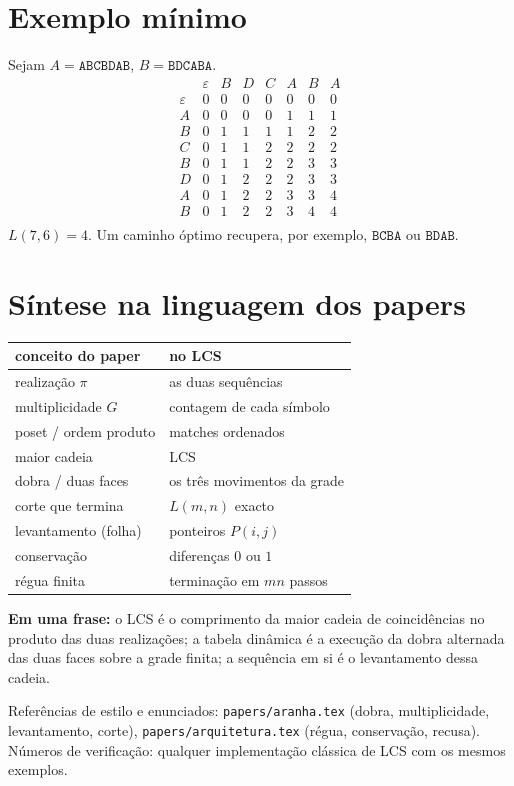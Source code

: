 \documentclass[11pt,a4paper]{article}
\begin{document}
\section{Exemplo mínimo}

Sejam $A=\texttt{ABCBDAB}$, $B=\texttt{BDCABA}$.
\[
\begin{array}{c|ccccccc}
 & \varepsilon & B & D & C & A & B & A\\\hline
\varepsilon & 0 & 0 & 0 & 0 & 0 & 0 & 0\\
A & 0 & 0 & 0 & 0 & 1 & 1 & 1\\
B & 0 & 1 & 1 & 1 & 1 & 2 & 2\\
C & 0 & 1 & 1 & 2 & 2 & 2 & 2\\
B & 0 & 1 & 1 & 2 & 2 & 3 & 3\\
D & 0 & 1 & 2 & 2 & 2 & 3 & 3\\
A & 0 & 1 & 2 & 2 & 3 & 3 & 4\\
B & 0 & 1 & 2 & 2 & 3 & 4 & 4\\
\end{array}
\]
$L(7,6)=4$. Um caminho óptimo recupera, por exemplo, $\texttt{BCBA}$
ou $\texttt{BDAB}$.

\section{Síntese na linguagem dos papers}

\begin{center}
\begin{tabular}{@{}ll@{}}
\toprule
conceito do paper & no LCS \\
\midrule
realização $\pi$ & as duas sequências \\
multiplicidade $G$ & contagem de cada símbolo \\
poset / ordem produto & matches ordenados \\
maior cadeia & LCS \\
dobra / duas faces & os três movimentos da grade \\
corte que termina & $L(m,n)$ exacto \\
levantamento (folha) & ponteiros $P(i,j)$ \\
conservação & diferenças $0$ ou $1$ \\
régua finita & terminação em $mn$ passos \\
\bottomrule
\end{tabular}
\end{center}

\medskip
\noindent\textbf{Em uma frase:}
o LCS é o comprimento da maior cadeia de coincidências no produto
das duas realizações; a tabela dinâmica é a execução da dobra
alternada das duas faces sobre a grade finita; a sequência em si é
o levantamento dessa cadeia.

\vfill
{\footnotesize\color{cinza}
Referências de estilo e enunciados: \texttt{papers/aranha.tex}
(dobra, multiplicidade, levantamento, corte),
\texttt{papers/arquitetura.tex} (régua, conservação, recusa).
Números de verificação: qualquer implementação clássica de LCS
com os mesmos exemplos.}
\end{document}
